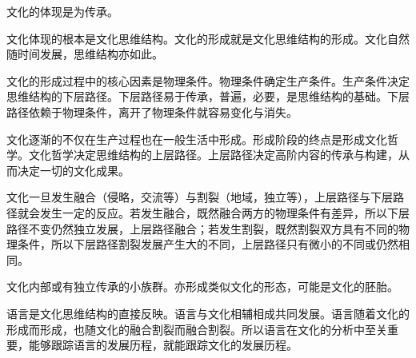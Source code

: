 \documentclass{ctexart}
\begin{document}
文化的体现是为传承。

文化体现的根本是文化思维结构。文化的形成就是文化思维结构的形成。文化自然随时间发展，思维结构亦如此。

文化的形成过程中的核心因素是物理条件。物理条件确定生产条件。生产条件决定思维结构的下层路径。下层路径易于传承，普遍，必要，是思维结构的基础。下层路径依赖于物理条件，离开了物理条件就容易变化与消失。

文化逐渐的不仅在生产过程也在一般生活中形成。形成阶段的终点是形成文化哲学。文化哲学决定思维结构的上层路径。上层路径决定高阶内容的传承与构建，从而决定一切的文化成果。

文化一旦发生融合（侵略，交流等）与割裂（地域，独立等），上层路径与下层路径就会发生一定的反应。若发生融合，既然融合两方的物理条件有差异，所以下层路径不变仍然独立发展，上层路径融合；若发生割裂，既然割裂双方具有不同的物理条件，所以下层路径割裂发展产生大的不同，上层路径只有微小的不同或仍然相同。

文化内部或有独立传承的小族群。亦形成类似文化的形态，可能是文化的胚胎。

语言是文化思维结构的直接反映。语言与文化相辅相成共同发展。语言随着文化的形成而形成，也随文化的融合割裂而融合割裂。所以语言在文化的分析中至关重要，能够跟踪语言的发展历程，就能跟踪文化的发展历程。
\end{document}
